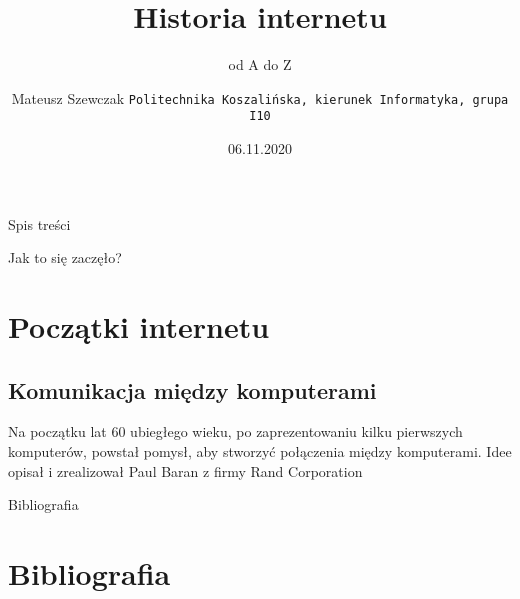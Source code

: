 \documentclass{beamer}
\title{Historia internetu}
\subtitle{od A do Z}
\author[Mateusz Szewczak]{Mateusz Szewczak
	\texttt{Politechnika Koszalińska, kierunek Informatyka, grupa I10}}
\date[PLâ€™20]{06.11.2020}
\begin{document}
	
	\begin{frame}
		\maketitle
	\end{frame}
	\begin{frame}{Spis treści}
		\tableofcontents
	\end{frame}
	\begin{frame}{Jak to się zaczęło?}
		\section{Początki internetu}
		\subsection{Komunikacja między komputerami}
		Na początku lat 60 ubiegłego wieku, po zaprezentowaniu kilku pierwszych komputerów, powstał pomysł, aby stworzyć połączenia między komputerami. Idee opisał i zrealizował Paul Baran z firmy Rand Corporation
		\nocite{hist:int:wiki}
		
	\end{frame}
	\begin{frame}{Bibliografia}
	\section{Bibliografia}
	
	\end{frame}
\end{document}
